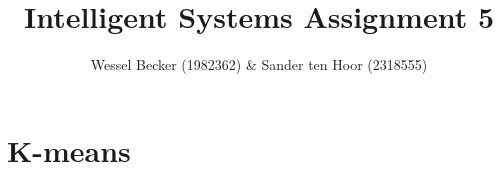 \documentclass[10pt,a4paper]{article}
\begin{document}
\title{Intelligent Systems Assignment 5}
\author{Wessel Becker (1982362) \& Sander ten Hoor (2318555)}
\maketitle

\newcommand{\simplesubfigure}[3]{
  \noindent\begin{minipage}{.31\linewidth}
    \begin{center}
      \texttt{[image: \#1]}
      \captionof{figure}{#2}
    \end{center}
    \label{#3}
  \end{minipage}\hspace{6pt}
}
\newcommand{\simplefigure}[3]{
	\noindent\begin{figure}[H]
  	\centering
    	\makebox[.6\textwidth]
    	{
    		\texttt{[image: \#1]}
 		} \\
  		\caption{#2}
  		\label{#3}
	\end{figure}
}
\newcommand{\mcode}[1]{
	
}

\section{K-means}
\end{document}
